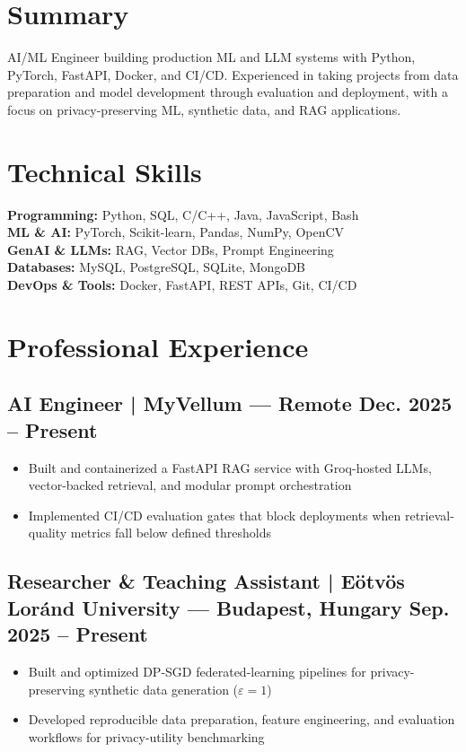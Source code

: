 \documentclass[10pt]{article}
\newcommand{\skills}[1]{\textbf{#1}}
\begin{document}
\linespread{0.95}\selectfont
\thispagestyle{first_page}

\noindent
\begin{minipage}[t]{0.51\textwidth}
\section{Summary}
\raggedright
AI/ML Engineer building production ML and LLM systems with Python, PyTorch, FastAPI, Docker, and CI/CD. Experienced in taking projects from data preparation and model development through evaluation and deployment, with a focus on privacy-preserving ML, synthetic data, and RAG applications.
\end{minipage}%
\hfill
\begin{minipage}[t]{0.46\textwidth}
\section{Technical Skills}
\skills{Programming:} Python, SQL, C/C++, Java, JavaScript, Bash \\
\skills{ML \& AI:} PyTorch, Scikit-learn, Pandas, NumPy, OpenCV \\
\skills{GenAI \& LLMs:} RAG, Vector DBs, Prompt Engineering \\
\skills{Databases:} MySQL, PostgreSQL, SQLite, MongoDB \\
\skills{DevOps \& Tools:} Docker, FastAPI, REST APIs, Git, CI/CD
\end{minipage}

\section{Professional Experience}

\subsection{AI Engineer | \mdseries MyVellum --- Remote \hfill \bfseries Dec. 2025 -- Present}
\begin{itemize}
    \item Built and containerized a FastAPI RAG service with Groq-hosted LLMs, vector-backed retrieval, and modular prompt orchestration
    \item Implemented CI/CD evaluation gates that block deployments when retrieval-quality metrics fall below defined thresholds
\end{itemize}

\subsection{Researcher \& Teaching Assistant | \mdseries E\"otv\"os Lor\'and University --- Budapest, Hungary \hfill \bfseries Sep. 2025 -- Present}
\begin{itemize}
    \item Built and optimized DP-SGD federated-learning pipelines for privacy-preserving synthetic data generation ($\varepsilon=1$)
    \item Developed reproducible data preparation, feature engineering, and evaluation workflows for privacy-utility benchmarking
\end{itemize}
\end{document}
